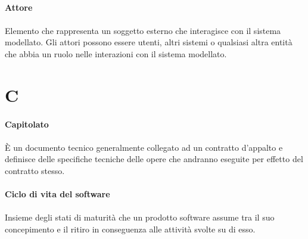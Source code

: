 \documentclass[10pt, a4paper]{article}
\begin{document}
\vspace{2em}
\paragraph{Attore}\noindent\hrulefill
\paragraph{}Elemento che rappresenta un soggetto esterno che interagisce con il sistema modellato. Gli attori possono essere utenti, altri sistemi o qualsiasi altra entità che abbia un ruolo nelle interazioni con il sistema modellato.





\newpage
\section{C}

\vspace{2em}
\paragraph{Capitolato}\noindent\hrulefill\noindent\hrulefill
\paragraph{} È un documento tecnico generalmente collegato ad un contratto d'appalto e definisce delle specifiche tecniche delle opere che andranno eseguite per effetto del contratto stesso.

\vspace{2em}
\paragraph{Ciclo di vita del software}\noindent\hrulefill\noindent\hrulefill
\paragraph{}Insieme degli stati di maturità che un prodotto software assume tra il suo concepimento e il ritiro in conseguenza alle
attività svolte su di esso.
\end{document}
